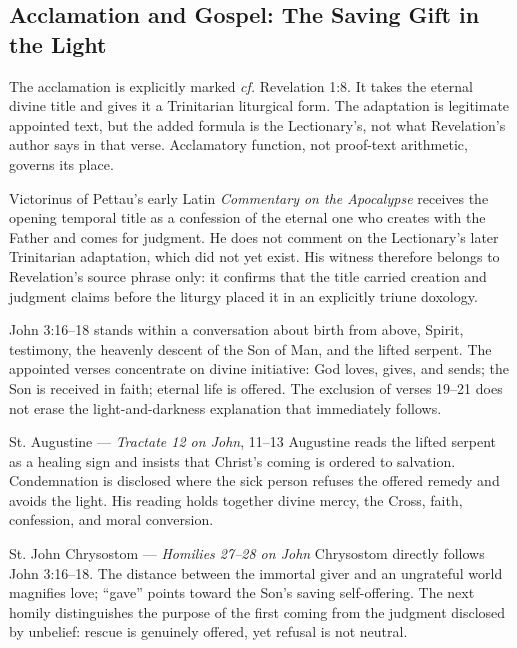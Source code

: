 \subsection*{Acclamation and Gospel: The Saving Gift in the Light\enspace{}}

The acclamation is explicitly marked \emph{cf.} Revelation 1:8. It takes the eternal divine title and gives it a Trinitarian liturgical form. The adaptation is legitimate appointed text, but the added formula is the Lectionary's, not what Revelation's author says in that verse. Acclamatory function, not proof-text arithmetic, governs its place.

Victorinus of Pettau's early Latin \emph{Commentary on the Apocalypse} receives the opening temporal title as a confession of the eternal one who creates with the Father and comes for judgment. He does not comment on the Lectionary's later Trinitarian adaptation, which did not yet exist. His witness therefore belongs to Revelation's source phrase only: it confirms that the title carried creation and judgment claims before the liturgy placed it in an explicitly triune doxology.

John 3:16--18 stands within a conversation about birth from above, Spirit, testimony, the heavenly descent of the Son of Man, and the lifted serpent. The appointed verses concentrate on divine initiative: God loves, gives, and sends; the Son is received in faith; eternal life is offered. The exclusion of verses 19--21 does not erase the light-and-darkness explanation that immediately follows.

\begin{sourcecard}{St. Augustine --- \emph{Tractate 12 on John}, 11--13}
Augustine reads the lifted serpent as a healing sign and insists that Christ's coming is ordered to salvation. Condemnation is disclosed where the sick person refuses the offered remedy and avoids the light. His reading holds together divine mercy, the Cross, faith, confession, and moral conversion.
\end{sourcecard}

\begin{sourcecard}{St. John Chrysostom --- \emph{Homilies 27--28 on John}}
Chrysostom directly follows John 3:16--18. The distance between the immortal giver and an ungrateful world magnifies love; “gave” points toward the Son's saving self-offering. The next homily distinguishes the purpose of the first coming from the judgment disclosed by unbelief: rescue is genuinely offered, yet refusal is not neutral.
\end{sourcecard}

